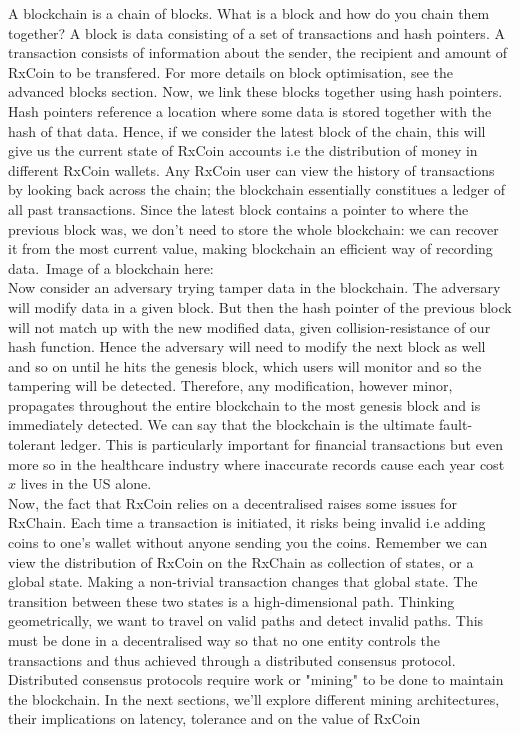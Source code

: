 A blockchain is a chain of blocks. What is a block and how do you chain them together? A block is data consisting of a set of transactions and hash pointers. A transaction consists of information about the sender, the recipient and amount of RxCoin to be transfered. For more details on block optimisation, see the advanced blocks section. Now, we link these blocks together using hash pointers. Hash pointers reference a location where some data is stored together with the hash of that data.
Hence, if we consider the latest block of the chain, this will give us the current state of RxCoin accounts i.e the distribution of money in different RxCoin wallets. Any RxCoin user can view the history of transactions by looking back across the chain; the blockchain essentially constitues a ledger of all past transactions. Since the latest block contains a pointer to where the previous block was, we don't need to store the whole blockchain: we can recover it from the most current value, making blockchain an efficient way of recording data.\
Image of a blockchain here:\ %
\\

Now consider an adversary trying tamper data in the blockchain. The adversary will modify data in a given block. But then the hash pointer of the previous block will not match up with the new modified data, given collision-resistance of our hash function. Hence the adversary will need to modify the next block as well and so on until he hits the genesis block, which users will monitor and so the tampering will be detected. Therefore, any modification, however minor, propagates throughout the entire blockchain to the most genesis block and is immediately detected. We can say that the blockchain is the ultimate fault-tolerant ledger. This is particularly important for financial transactions but even more so in the healthcare industry where inaccurate records cause each year cost $x$ lives in the US alone.
 \\
 
Now, the fact that RxCoin relies on a decentralised  raises some issues for RxChain. Each time a transaction is initiated, it risks being invalid i.e adding coins to one's wallet without anyone sending you the coins. Remember we can view the distribution of RxCoin on the RxChain as collection of states, or a global state. Making a non-trivial transaction changes that global state. The transition between these two states is a high-dimensional path. Thinking geometrically, we want to travel on valid paths and detect invalid paths. This must be done in a decentralised way so that no one entity controls the transactions and thus achieved through a distributed consensus protocol. Distributed consensus protocols require work or "mining" to be done to maintain the blockchain. In the next sections, we'll explore different mining architectures, their implications on latency, tolerance and on the value of RxCoin
